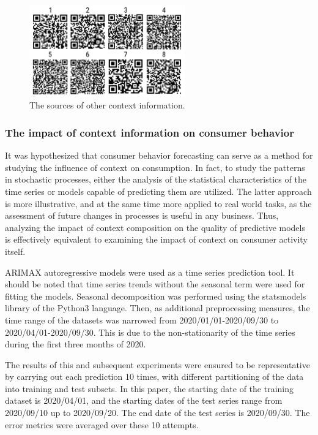 \documentclass[13pt, a4paper]{article}
\begin{document}
\begin{figure}[h!]\vspace*{4pt}
	\centerline{\includegraphics[width=0.6\textwidth]{./visuals/gr9.png}}
\caption{The sources of other context information.}
\label{fig:gr9}
\end{figure}

\subsubsection{The impact of context information on consumer behavior}

It was hypothesized that consumer behavior forecasting can serve as a method for studying the influence of context on consumption. In fact, to study the patterns in stochastic processes, either the analysis of the statistical characteristics of the time series or models capable of predicting them are utilized. The latter approach is more illustrative, and at the same time more applied to real world tasks, as the assessment of future changes in processes is useful in any business. Thus, analyzing the impact of context composition on the quality of predictive models is effectively equivalent to examining the impact of context on consumer activity itself. 

ARIMAX autoregressive models were used as a time series prediction tool. It should be noted that time series trends without the seasonal term were used for fitting the models. Seasonal decomposition was performed using the statsmodels library of the Python3 language. Then, as additional preprocessing measures, the time range of the datasets was narrowed from 2020/01/01-2020/09/30 to 2020/04/01-2020/09/30. This is due to the non-stationarity of the time series during the first three months of 2020.

The results of this and subsequent experiments were ensured to be representative by carrying out each prediction 10 times, with different partitioning of the data into training and test subsets. In this paper, the starting date of the training dataset is 2020/04/01, and the starting dates of the test series range from 2020/09/10 up to 2020/09/20. The end date of the test series is 2020/09/30. The error metrics were averaged over these 10 attempts. 
\end{document}
